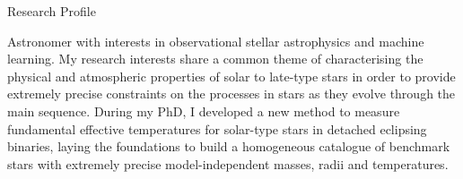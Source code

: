 \begin{rubric}{Research Profile}

\begin{minipage}{0.98\linewidth}
Astronomer with interests in observational stellar astrophysics and machine learning.
My research interests share a common theme of characterising the physical and atmospheric properties of solar to late-type stars in order to provide extremely precise constraints on the processes in stars as they evolve through the main sequence.
During my PhD, I developed a new method to measure fundamental effective temperatures for solar-type stars in detached eclipsing binaries, laying the foundations to build a homogeneous catalogue of benchmark stars with extremely precise model-independent masses, radii and temperatures.

\end{minipage}
\end{rubric}